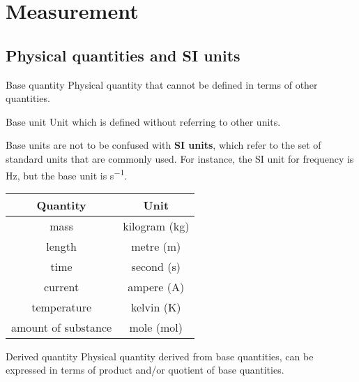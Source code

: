 \section{Measurement}
\subsection{Physical quantities and SI units}
\begin{defn}{Base quantity}{}
Physical quantity that cannot be defined in terms of other quantities.
\end{defn}

\begin{defn}{Base unit}{}
Unit which is defined without referring to other units.
\end{defn}
\begin{remark}
Base units are not to be confused with \textbf{SI units}, which refer to the set of standard units that are commonly used. For instance, the SI unit for frequency is \unit{Hz}, but the base unit is \unit{s^{-1}}.
\end{remark}

\begin{table}[H]
	\centering
	\begin{tabular}{cc} 
	\hline\hline
	\textbf{Quantity} & \textbf{Unit} \\ 
	\hline
	mass & kilogram (kg) \\
	length & metre (m) \\
	time & second (s) \\
	current & ampere (A) \\
	temperature & kelvin (K) \\
	amount of substance & mole (mol) \\
	\hline\hline
	\end{tabular}
\end{table}

\begin{defn}{Derived quantity}{}
Physical quantity derived from base quantities, can be expressed in terms of product and/or quotient of base quantities.
\end{defn}

